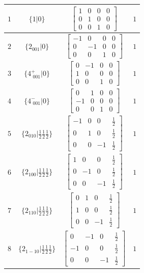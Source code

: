 \documentclass[fleqn,8pt]{jsarticle}
\begin{document}
\begin{longtable}{cccc}
$ 1 $ & $ \{1|0\} $ & $ \begin{bmatrix} 1 & 0 & 0 & 0 \\ 0 & 1 & 0 & 0 \\ 0 & 0 & 1 & 0 \end{bmatrix} $ & $ 1 $ \\ \hline
$ 2 $ & $ \{2{}_{001}|0\} $ & $ \begin{bmatrix} -1 & 0 & 0 & 0 \\ 0 & -1 & 0 & 0 \\ 0 & 0 & 1 & 0 \end{bmatrix} $ & $ 1 $ \\ \hline
$ 3 $ & $ \{4^{+}_{\,\,001}|0\} $ & $ \begin{bmatrix} 0 & -1 & 0 & 0 \\ 1 & 0 & 0 & 0 \\ 0 & 0 & 1 & 0 \end{bmatrix} $ & $ 1 $ \\ \hline
$ 4 $ & $ \{4^{-}_{\,\,001}|0\} $ & $ \begin{bmatrix} 0 & 1 & 0 & 0 \\ -1 & 0 & 0 & 0 \\ 0 & 0 & 1 & 0 \end{bmatrix} $ & $ 1 $ \\ \hline
$ 5 $ & $ \{2{}_{010}|\frac{1}{2} \frac{1}{2} \frac{1}{2}\} $ & $ \begin{bmatrix} -1 & 0 & 0 & \frac{1}{2} \\ 0 & 1 & 0 & \frac{1}{2} \\ 0 & 0 & -1 & \frac{1}{2} \end{bmatrix} $ & $ 1 $ \\ \hline
$ 6 $ & $ \{2{}_{100}|\frac{1}{2} \frac{1}{2} \frac{1}{2}\} $ & $ \begin{bmatrix} 1 & 0 & 0 & \frac{1}{2} \\ 0 & -1 & 0 & \frac{1}{2} \\ 0 & 0 & -1 & \frac{1}{2} \end{bmatrix} $ & $ 1 $ \\ \hline
$ 7 $ & $ \{2{}_{110}|\frac{1}{2} \frac{1}{2} \frac{1}{2}\} $ & $ \begin{bmatrix} 0 & 1 & 0 & \frac{1}{2} \\ 1 & 0 & 0 & \frac{1}{2} \\ 0 & 0 & -1 & \frac{1}{2} \end{bmatrix} $ & $ 1 $ \\ \hline
$ 8 $ & $ \{2{}_{1-10}|\frac{1}{2} \frac{1}{2} \frac{1}{2}\} $ & $ \begin{bmatrix} 0 & -1 & 0 & \frac{1}{2} \\ -1 & 0 & 0 & \frac{1}{2} \\ 0 & 0 & -1 & \frac{1}{2} \end{bmatrix} $ & $ 1 $ \\ \hline

\end{longtable}
\end{document}
